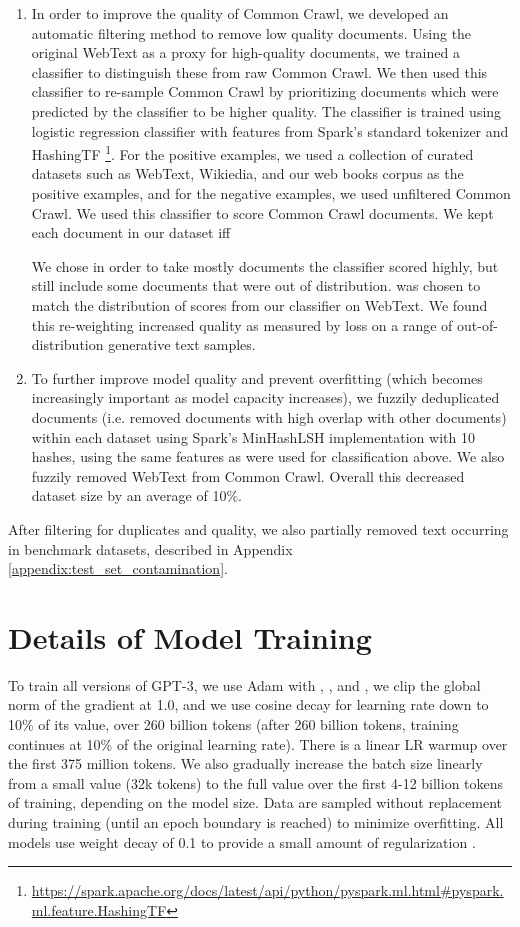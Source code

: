 \documentclass{article}
\begin{document}
\begin{enumerate}

\item In order to improve the quality of Common Crawl, we developed an automatic filtering method to remove low quality documents. Using the original WebText as a proxy for high-quality documents, we trained a classifier to distinguish these from raw Common Crawl. We then used this classifier to re-sample Common Crawl by prioritizing documents which were predicted by the classifier to be higher quality. The classifier is trained using logistic regression classifier with features from Spark's standard tokenizer and HashingTF \footnote{\url{https://spark.apache.org/docs/latest/api/python/pyspark.ml.html\#pyspark.ml.feature.HashingTF}}. For the positive examples, we used a collection of curated datasets such as WebText, Wikiedia, and our web books corpus as the positive examples, and for the negative examples, we used unfiltered Common Crawl.  We used this classifier to score Common Crawl documents. We kept each document in our dataset iff



We chose  in order to take mostly documents the classifier scored highly, but still include some documents that were out of distribution.  was chosen to match the distribution of scores from our classifier on WebText.  We found this re-weighting increased quality as measured by loss on a range of out-of-distribution generative text samples.
\item To further improve model quality and prevent overfitting (which becomes increasingly important as model capacity increases), we fuzzily deduplicated documents (i.e. removed documents with high overlap with other documents) within each dataset using Spark's MinHashLSH implementation with 10 hashes, using the same features as were used for classification above.  We also fuzzily removed WebText from Common Crawl. Overall this decreased dataset size by an average of 10\%.

\end{enumerate}

After filtering for duplicates and quality, we also partially removed text occurring in benchmark datasets, described in Appendix \ref{appendix:test_set_contamination}. \section{Details of Model Training}
\label{appendix:model_training}
To train all versions of GPT-3, we use Adam with , , and , we clip the global norm of the gradient at 1.0, and we use cosine decay for learning rate down to 10\% of its value, over 260 billion tokens (after 260 billion tokens, training continues at 10\% of the original learning rate).  There is a linear LR warmup over the first 375 million tokens.  We also gradually increase the batch size linearly from a small value (32k tokens) to the full value over the first 4-12 billion tokens of training, depending on the model size.  Data are sampled without replacement during training (until an epoch boundary is reached) to minimize overfitting. All models use weight decay of 0.1 to provide a small amount of regularization \cite{loshchilov2017decoupled}.
\end{document}
